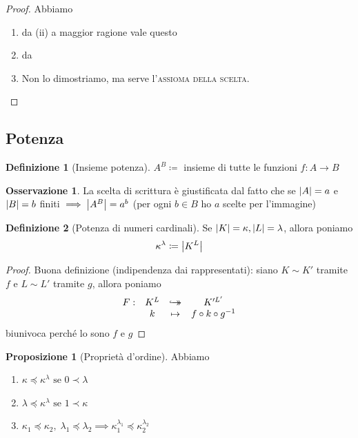 \documentclass[a4paper,10pt]{article}
\theoremstyle{definition}
\newcommand{\noun}[1]{\textsc{#1}}
\newcommand{\hookdoubleheadrightarrow}{\hookrightarrow\mathrel{\mspace{-15mu}}\rightarrow}
\newcommand{\bij}{\hookdoubleheadrightarrow} %
\theoremstyle{indentdefinition}
\newtheorem{defn}{Definizione}[section]
\theoremstyle{indentpostulate}
\theoremstyle{indenttheorem}
\newtheorem{prop}{Proposizione}[section]
\theoremstyle{myremark}
\newtheorem*{rem*}{Osservazione}
\theoremstyle{indentgeneral}
\begin{document}
\begin{proof}
    Abbiamo
    \begin{enumerate}
        \item da (ii) a maggior ragione vale questo 
        \item da 
        \item Non lo dimostriamo, ma serve l'\noun{assioma della scelta}.
    \end{enumerate}
\end{proof}

\subsection{Potenza}

\begin{defn}[Insieme potenza]
    $A^B\coloneqq$ insieme di tutte le funzioni $f:A\to B$
\end{defn}

\begin{rem*}
    La scelta di scrittura è giustificata dal fatto che se $\abs{A}=a$ e $\abs{B}=b$ finiti $\implies \abs{A^B}=a^b$ (per ogni $b\in B$ ho $a$ scelte per l'immagine)
\end{rem*}

\begin{defn}[Potenza di numeri cardinali] Se
    $\abs{K}=\kappa,\abs{L}=\lambda$, allora poniamo $$\kappa^\lambda\coloneqq\abs{K^L}$$
\end{defn}
\begin{proof} Buona definizione (indipendenza dai rappresentati): siano $K\sim K'$ tramite $f$ e  $L\sim L'$ tramite $g$, allora poniamo
$$\begin{array}{cccc}
   F:  & K^L & \bij & K'^{L'}  \\
       &  k & \mapsto & f\circ k  \circ g^{-1}
\end{array}$$
    biunivoca perché lo sono $f$ e $g$
\end{proof}

\begin{prop}[Proprietà d'ordine]
    Abbiamo
    \begin{enumerate}
       \item $\kappa \preceq \kappa^\lambda  \text{ se } 0\prec \lambda$
        \item $\lambda \preceq \kappa^\lambda  \text{ se } 1\prec \kappa$ 
        \item $\kappa_1\preceq\kappa_2,\;\lambda_1\preceq\lambda_2\implies\kappa_1^{\lambda_1}\preceq\kappa_2^{\lambda_2}$
    \end{enumerate}
\end{prop}
\end{document}
